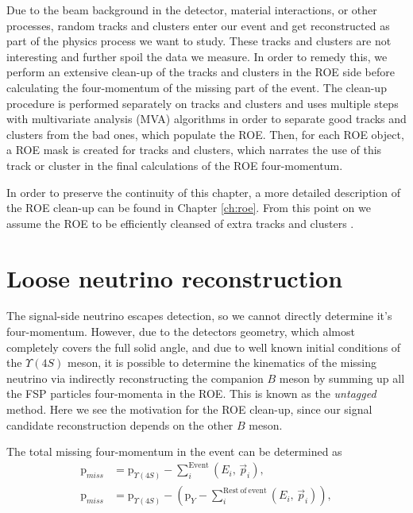 \documentclass[  headings=standardclasses,
  headings=big,oneside,a4paper,openany,12pt]{scrbook}
\begin{document}
Due to the beam background in the detector, material interactions, or other processes, random tracks and clusters enter our event and get reconstructed as part of the physics process we want to study. These tracks and clusters are not interesting and further spoil the data we measure. In order to remedy this, we perform an extensive clean-up of the tracks and clusters in the ROE side before calculating the four-momentum of the missing part of the event. The clean-up procedure is performed separately on tracks and clusters and uses multiple steps with multivariate analysis (MVA) algorithms in order to separate good tracks and clusters from the bad ones, which populate the ROE. Then, for each ROE object, a ROE mask is created for tracks and clusters, which narrates the use of this track or cluster in the final calculations of the ROE four-momentum.

In order to preserve the continuity of this chapter, a more detailed description of the ROE clean-up can be found in Chapter \ref{ch:roe}. From this point on we assume the ROE to be efficiently cleansed of extra tracks and clusters .

\section{Loose neutrino reconstruction}

The signal-side neutrino escapes detection, so we cannot directly determine it's four-momentum. However, due to the detectors geometry, which almost completely covers the full solid angle, and due to well known initial conditions of the $\Upsilon(4S)$ meson, it is possible to determine the kinematics of the missing neutrino via indirectly reconstructing the companion $B$ meson by summing up all the FSP particles four-momenta in the ROE. This is known as the \textit{untagged} method. Here we see the motivation for the ROE clean-up, since our signal candidate reconstruction depends on the other $B$ meson.

The total missing four-momentum in the event can be determined as
\begin{align}
\mathrm{p}_{miss} &= \mathrm{p}_{\Upsilon(4S)} - \sum_i^{\mathrm{Event}}\left(E_i,\,\vec{p}_i \right),\\
\label{eq:ROEloop}
\mathrm{p}_{miss} &= \mathrm{p}_{\Upsilon(4S)} - \left(\mathrm{p}_{Y} -\sum_i^{\mathrm{Rest~of~event}}\left(E_i,\,\vec{p}_i \right)\right),
\end{align}
\end{document}
